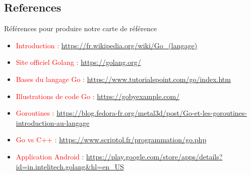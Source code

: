 \documentclass{beamer}
\begin{document}
\subsection{References}

\begin{frame}
\begin{block}{Références pour produire notre carte de référence} 
	\begin{itemize}
		[circle]
		\item \textcolor{red}{Introduction :} \footnotesize \url{https://fr.wikipedia.org/wiki/Go_(langage)} \normalsize
		\item \textcolor{red}{Site officiel Golang :} \footnotesize \url{https://golang.org/} \normalsize
		\item \textcolor{red}{Bases du langage Go :} \footnotesize \url{https://www.tutorialspoint.com/go/index.htm} \normalsize
		\item \textcolor{red}{Illustrations de code Go :} \footnotesize \url{https://gobyexample.com/} \normalsize
		\item \textcolor{red}{Goroutines :} \footnotesize \url{https://blog.fedora-fr.org/metal3d/post/Go-et-les-goroutines-introduction-au-langage} \normalsize
		\item \textcolor{red}{Go vs C++ :} \footnotesize \url{https://www.scriptol.fr/programmation/go.php} \normalsize
		\item \textcolor{red}{Application Android :} \footnotesize \url{https://play.google.com/store/apps/details?id=in.intelitech.golang&hl=en_US} \normalsize
	\end{itemize}
\end{block}
\end{frame}

      
\end{document}

